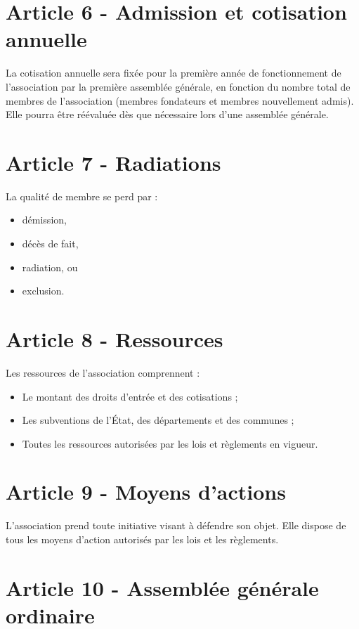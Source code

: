 \documentclass[a4paper,oneside,10pt]{article}
\begin{document}
\section*{Article 6 - Admission et cotisation annuelle}

La cotisation annuelle sera fixée pour la première année de fonctionnement de l'association par la première assemblée générale, en fonction du nombre total de membres de l'association (membres fondateurs et membres nouvellement admis). Elle pourra être réévaluée dès que nécessaire lors d'une assemblée générale.

\section*{Article 7 - Radiations}

La qualité de membre se perd par :
\begin{itemize}
\item démission,
\item décès de fait,
\item radiation, ou
\item exclusion.
\end{itemize}

\section*{Article 8 - Ressources}

Les ressources de l'association comprennent :

\begin{itemize}
\item Le montant des droits d'entrée et des cotisations ;
\item Les subventions de l'État, des départements et des communes ;
\item Toutes les ressources autorisées par les lois et règlements en vigueur.
\end{itemize}

\section*{Article 9 - Moyens d'actions}

L'association prend toute initiative visant à défendre son objet. Elle dispose de tous les moyens d'action autorisés par les lois et les règlements.

\section*{Article 10 - Assemblée générale ordinaire}
\end{document}
